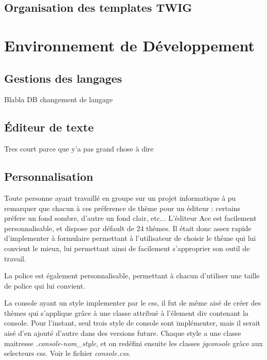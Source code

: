 
\subsection{Organisation des templates TWIG}

\section{Environnement de Développement}

\subsection{Gestions des langages}
Blabla DB changement de langage

\subsection{Éditeur de texte}
Tres court parce que y'a pas grand chose à dire

\subsection{Personnalisation}

Toute personne ayant travaillé en groupe sur un projet informatique à pu remarquer que chacun à ces préference de thème pour un éditeur : certains préfere un fond sombre, d'autre un fond clair, etc...
L'éditeur Ace est facilement personnalisable, et dispose par défault de 24 thèmes. Il était donc assez rapide d'implementer à formulaire permettant à l'utilisateur de choisir le thème qui lui convient le mieux,
lui permettant ainsi de facilement s'approprier son outil de travail.

La police est également personnalisable, permettant à chacun d'utiliser une taille de police qui lui convient.

La console ayant un style implementer par le css, il fut de même aisé de créer des thèmes qui s'applique grâce à une classe attribué à l'élement div contenant la console.
Pour l'instant, seul trois style de console sont implémenter, mais il serait aisé d'en ajouté d'autre dans des versions future.
Chaque style a une classe maitresse \emph{.console-nom\_style}, et on redéfini ensuite les classes \emph{jqconsole} grâce aux selecteurs css. Voir le fichier \emph{console.css}.

